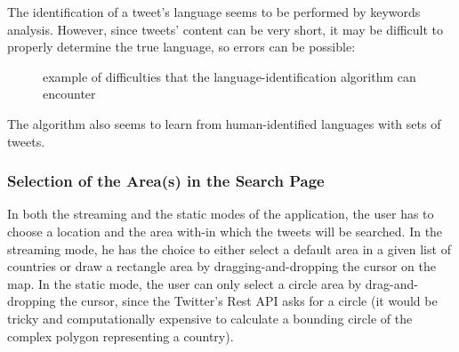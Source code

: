 \documentclass[a4paper,11pt]{report}
\begin{document}
The identification of a tweet's language\cite{MitjaTrampus2015} seems to be performed by keywords analysis. However, since tweets' content can be very short, it may be difficult to properly determine the true language, so errors can be possible:
\begin{figure}[H]
\vspace{-5pt}
\begin{center}
\vspace{-20pt}
\caption{example of difficulties that the language-identification algorithm can encounter\cite{MitjaTrampus2015}}
\end{center}
\end{figure}

The algorithm also seems to learn from human-identified languages with sets of tweets.
\bigskip

\subsubsection{Selection of the Area(s) in the Search Page}
In both the streaming and the static modes of the application, the user has to choose a location and the area with-in which the tweets will be searched. In the streaming mode, he has the choice to either select a default area in a given list of countries or draw a rectangle area by dragging-and-dropping the cursor on the map. In the static mode, the user can only select a circle area by drag-and-dropping the cursor, since the Twitter's Rest API asks for a circle (it would be tricky and computationally expensive to calculate a bounding circle of the complex polygon representing a country).
\newpage
\end{document}
